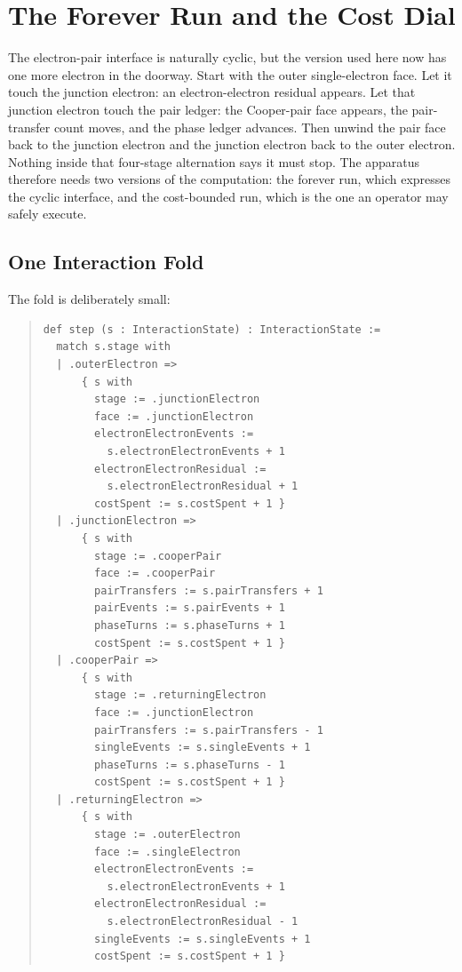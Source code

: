 \chapter{The Forever Run and the Cost Dial}

The electron-pair interface is naturally cyclic, but the version used here now has one more electron in the
doorway. Start with the outer single-electron face. Let it touch the junction electron: an electron-electron
residual appears. Let that junction electron touch the pair ledger: the Cooper-pair face appears, the
pair-transfer count moves, and the phase ledger advances. Then unwind the pair face back to the junction electron
and the junction electron back to the outer electron. Nothing inside that four-stage alternation says it must
stop. The apparatus therefore needs two versions of the computation: the forever run, which expresses the cyclic
interface, and the cost-bounded run, which is the one an operator may safely execute.

\section{One Interaction Fold}

The fold is deliberately small:

\begin{quote}\small
\begin{verbatim}
def step (s : InteractionState) : InteractionState :=
  match s.stage with
  | .outerElectron =>
      { s with
        stage := .junctionElectron
        face := .junctionElectron
        electronElectronEvents :=
          s.electronElectronEvents + 1
        electronElectronResidual :=
          s.electronElectronResidual + 1
        costSpent := s.costSpent + 1 }
  | .junctionElectron =>
      { s with
        stage := .cooperPair
        face := .cooperPair
        pairTransfers := s.pairTransfers + 1
        pairEvents := s.pairEvents + 1
        phaseTurns := s.phaseTurns + 1
        costSpent := s.costSpent + 1 }
  | .cooperPair =>
      { s with
        stage := .returningElectron
        face := .junctionElectron
        pairTransfers := s.pairTransfers - 1
        singleEvents := s.singleEvents + 1
        phaseTurns := s.phaseTurns - 1
        costSpent := s.costSpent + 1 }
  | .returningElectron =>
      { s with
        stage := .outerElectron
        face := .singleElectron
        electronElectronEvents :=
          s.electronElectronEvents + 1
        electronElectronResidual :=
          s.electronElectronResidual - 1
        singleEvents := s.singleEvents + 1
        costSpent := s.costSpent + 1 }
\end{verbatim}
\end{quote}

